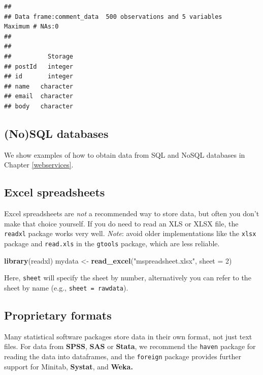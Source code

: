 \documentclass[]{book}
\newenvironment{Shaded}{\begin{snugshade}}{\end{snugshade}}
\newcommand{\DataTypeTok}[1]{\textcolor[rgb]{0.13,0.29,0.53}{#1}}
\newcommand{\DecValTok}[1]{\textcolor[rgb]{0.00,0.00,0.81}{#1}}
\newcommand{\KeywordTok}[1]{\textcolor[rgb]{0.13,0.29,0.53}{\textbf{#1}}}
\newcommand{\NormalTok}[1]{#1}
\newcommand{\StringTok}[1]{\textcolor[rgb]{0.31,0.60,0.02}{#1}}
\begin{document}
\begin{verbatim}
## 
## Data frame:comment_data  500 observations and 5 variables    Maximum # NAs:0
## 
## 
##          Storage
## postId   integer
## id       integer
## name   character
## email  character
## body   character
\end{verbatim}

\hypertarget{nosql-databases}{%
\subsection{(No)SQL databases}\label{nosql-databases}}

We show examples of how to obtain data from SQL and NoSQL databases in Chapter \ref{webservices}.

\hypertarget{excel-spreadsheets}{%
\subsection{Excel spreadsheets}\label{excel-spreadsheets}}

Excel spreadsheets are \emph{not} a recommended way to store data, but often you don't make that choice yourself. If you do need to read an XLS or XLSX file, the \texttt{readxl} package works very well. \emph{Note}: avoid older implementations like the \texttt{xlsx} package and \texttt{read.xls} in the \texttt{gtools} package, which are less reliable.

\begin{Shaded}
\begin{Highlighting}[]
\KeywordTok{library}\NormalTok{(readxl)}
\NormalTok{mydata <-}\StringTok{ }\KeywordTok{read_excel}\NormalTok{(}\StringTok{"mspreadsheet.xlsx"}\NormalTok{, }\DataTypeTok{sheet =} \DecValTok{2}\NormalTok{)}
\end{Highlighting}
\end{Shaded}

Here, \texttt{sheet} will specify the sheet by number, alternatively you can refer to the sheet by name (e.g., \texttt{sheet\ =\ \textquotesingle{}rawdata\textquotesingle{}}).

\hypertarget{proprietary-formats}{%
\subsection{Proprietary formats}\label{proprietary-formats}}

Many statistical software packages store data in their own format, not just text files. For data from \textbf{SPSS}, \textbf{SAS} or \textbf{Stata}, we recommend the \texttt{haven} package for reading the data into dataframes, and the \texttt{foreign} package provides further support for Minitab, \textbf{Systat}, and \textbf{Weka.}
\end{document}
